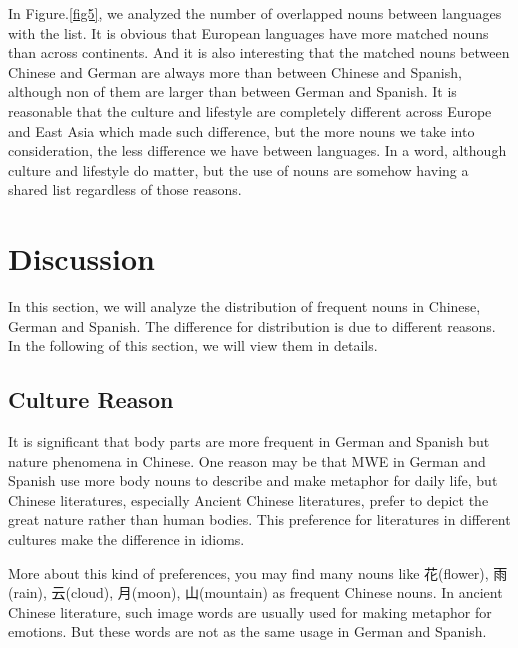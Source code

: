 In Figure.\ref{fig5}, we analyzed the number of overlapped nouns between languages with the list. It is obvious that European languages have more matched nouns than across continents. And it is also interesting that the matched nouns between Chinese and German are always more than between Chinese and Spanish, although non of them are larger than between German and Spanish. It is reasonable that the culture and lifestyle are completely different across Europe and East Asia which made such difference, but the more nouns we take into consideration, the less difference we have between languages. In a word, although culture and lifestyle do matter, but the use of nouns are somehow having a shared list regardless of those reasons. 




\section{Discussion}

In this section, we will analyze the distribution of frequent nouns in Chinese, German and Spanish. The difference for distribution is due to different reasons. In the following of this section, we will view them in details. 

\subsection{Culture Reason}
It is significant that body parts are more frequent in German and Spanish but nature phenomena in Chinese. One reason may be that MWE in German and Spanish use more body nouns to describe and make metaphor for daily life, but Chinese literatures, especially Ancient Chinese literatures, prefer to depict the great nature rather than human bodies. This preference for literatures in different cultures make the difference in idioms. 

More about this kind of preferences, you may find many nouns like 花(flower), 雨(rain), 云(cloud), 月(moon), 山(mountain) as frequent Chinese nouns. In ancient Chinese literature, such image words are usually used for making metaphor for emotions. But these words are not as the same usage in German and Spanish. 

